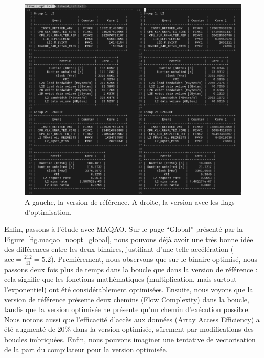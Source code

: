 \documentclass[12pt,a4paper]{article}
\begin{document}
\begin{figure}[ht]
    \centering
    \includegraphics[scale=0.45]{./figures/L1/likwid_noopt.png}
    \caption{A gauche, la version de référence. A droite, la version avec les
    flags d'optimisation.}
    \label{fig.likwid_noopt}
\end{figure}

Enfin, passons à l'étude avec MAQAO. Sur le page \enquote{Global} présenté par
la Figure~\ref{fig.maqao_noopt_global}, nous pouvons déjà avoir une très bonne
idée des différences entre les deux binaires, justifiant d'une telle
accélération ($\text{acc} = \frac{212}{41} = 5.2$). Premièrement, nous observons
que sur le binaire optimisé, nous passons deux fois plus de temps dans la boucle
que dans la version de référence : cela signifie que les fonctions
mathématiques (multiplication, mais surtout l'exponentiel) ont été
considérablement optimisées. Ensuite, nous voyons que la version de référence
présente deux chemins (Flow Complexity) dans la boucle, tandis que la version
optimisée ne présente qu'un chemin d'exécution possible. Nous notons aussi que
l'efficacité d'accès aux données (Array Access Efficiency) a été augmenté de
20\% dans la version optimisée, sûrement par modifications des boucles
imbriquées. Enfin, nous pouvons imaginer une tentative de vectorisation de la
part du compilateur pour la version optimisée.
\end{document}

